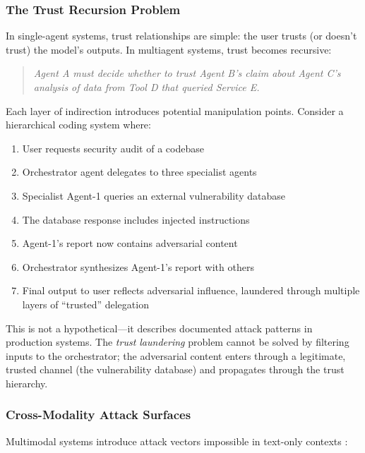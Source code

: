 \documentclass[
]{article}
\begin{document}
\subsubsection{The Trust Recursion
Problem}\label{the-trust-recursion-problem}

In single-agent systems, trust relationships are simple: the user trusts
(or doesn't trust) the model's outputs. In multiagent systems, trust
becomes recursive:

\begin{quote}
\textit{Agent A must decide whether to trust Agent B's claim about Agent C's analysis of data from Tool D that queried Service E.}
\end{quote}

Each layer of indirection introduces potential manipulation points.
Consider a hierarchical coding system where:

\begin{enumerate}
\item User requests security audit of a codebase
\item Orchestrator agent delegates to three specialist agents
\item Specialist Agent-1 queries an external vulnerability database
\item The database response includes injected instructions
\item Agent-1's report now contains adversarial content
\item Orchestrator synthesizes Agent-1's report with others
\item Final output to user reflects adversarial influence, laundered through multiple layers of ``trusted'' delegation
\end{enumerate}

This is not a hypothetical---it describes documented attack patterns in
production systems. The \textit{trust laundering} problem cannot be
solved by filtering inputs to the orchestrator; the adversarial content
enters through a legitimate, trusted channel (the vulnerability
database) and propagates through the trust hierarchy.

\subsubsection{Cross-Modality Attack
Surfaces}\label{cross-modality-attack-surfaces}

Multimodal systems introduce attack vectors impossible in text-only
contexts \cite{shayegani2023survey}:
\end{document}
